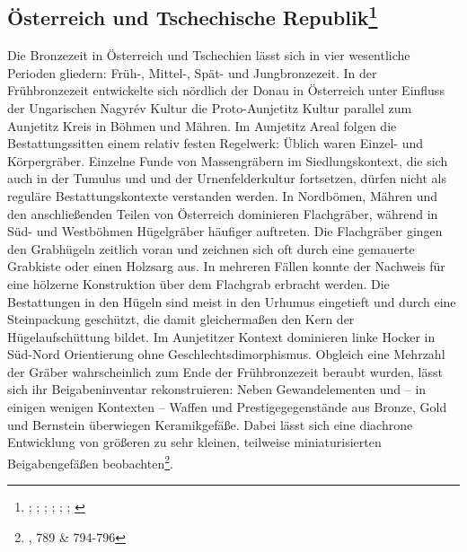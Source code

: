 \documentclass[openany,twoside,twocolumn]{book}
\let\rmarkdownfootnote\footnote%
\def\footnote{\protect\rmarkdownfootnote}
\begin{document}
\hypertarget{osterreich-und-tschechische-republik}{%
\subsection[Österreich und Tschechische
Republik]{\texorpdfstring{Österreich und Tschechische Republik\footnote{\textcite{hampl_mittelbronzezeitliche_1982};
  \textcite{hicke_hugel-_1987}; \textcite{lauermann_studien_2003};
  \textcite{lippert_brandbestattungen_2013};
  \textcite{lubos_czech_2013}; \textcite{neugebauer_bronzezeit_1994};
  \textcite{vera_saldova_burial_1990}}}{Österreich und Tschechische Republik}}\label{osterreich-und-tschechische-republik}}

Die Bronzezeit in Österreich und Tschechien lässt sich in vier
wesentliche Perioden gliedern: Früh-, Mittel-, Spät- und Jungbronzezeit.
In der Frühbronzezeit entwickelte sich nördlich der Donau in Österreich
unter Einfluss der Ungarischen Nagyrév Kultur die Proto-Aunjetitz Kultur
parallel zum Aunjetitz Kreis in Böhmen und Mähren. Im Aunjetitz Areal
folgen die Bestattungssitten einem relativ festen Regelwerk: Üblich
waren Einzel- und Körpergräber. Einzelne Funde von Massengräbern im
Siedlungskontext, die sich auch in der Tumulus und und der
Urnenfelderkultur fortsetzen, dürfen nicht als reguläre
Bestattungskontexte verstanden werden. In Nordbömen, Mähren und den
anschließenden Teilen von Österreich dominieren Flachgräber, während in
Süd- und Westböhmen Hügelgräber häufiger auftreten. Die Flachgräber
gingen den Grabhügeln zeitlich voran und zeichnen sich oft durch eine
gemauerte Grabkiste oder einen Holzsarg aus. In mehreren Fällen konnte
der Nachweis für eine hölzerne Konstruktion über dem Flachgrab erbracht
werden. Die Bestattungen in den Hügeln sind meist in den Urhumus
eingetieft und durch eine Steinpackung geschützt, die damit
gleichermaßen den Kern der Hügelaufschüttung bildet. Im Aunjetitzer
Kontext dominieren linke Hocker in Süd-Nord Orientierung ohne
Geschlechtsdimorphismus. Obgleich eine Mehrzahl der Gräber
wahrscheinlich zum Ende der Frühbronzezeit beraubt wurden, lässt sich
ihr Beigabeninventar rekonstruieren: Neben Gewandelementen und -- in
einigen wenigen Kontexten -- Waffen und Prestigegegenstände aus Bronze,
Gold und Bernstein überwiegen Keramikgefäße. Dabei lässt sich eine
diachrone Entwicklung von größeren zu sehr kleinen, teilweise
miniaturisierten Beigabengefäßen beobachten\footnote{\textcite{lubos_czech_2013},
  789 \& 794-796}.
\end{document}
